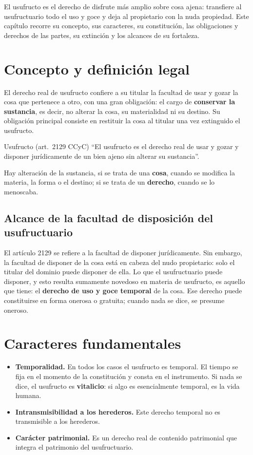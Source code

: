\documentclass[12pt,oneside]{book}
\begin{document}
El usufructo es el derecho de disfrute más amplio sobre cosa ajena: transfiere al usufructuario todo el uso y goce y deja al propietario con la nuda propiedad. Este capítulo recorre su concepto, sus caracteres, su constitución, las obligaciones y derechos de las partes, su extinción y los alcances de su fortaleza.

\section{Concepto y definición legal}

El derecho real de usufructo confiere a su titular la facultad de usar y gozar la cosa que pertenece a otro, con una gran obligación: el cargo de \textbf{conservar la sustancia}, es decir, no alterar la cosa, su materialidad ni su destino. Su obligación principal consiste en restituir la cosa al titular una vez extinguido el usufructo.

\begin{definition}{Usufructo (art.~2129 CCyC)}
``El usufructo es el derecho real de usar y gozar y disponer jurídicamente de un bien ajeno sin alterar su sustancia''.
\end{definition}

Hay alteración de la sustancia, si se trata de una \textbf{cosa}, cuando se modifica la materia, la forma o el destino; si se trata de un \textbf{derecho}, cuando se lo menoscaba.

\subsection{Alcance de la facultad de disposición del usufructuario}

El artículo 2129 se refiere a la facultad de disponer jurídicamente. Sin embargo, la facultad de disponer de la cosa está en cabeza del nudo propietario: solo el titular del dominio puede disponer de ella. Lo que el usufructuario puede disponer, y esto resulta sumamente novedoso en materia de usufructo, es aquello que tiene: el \textbf{derecho de uso y goce temporal} de la cosa. Ese derecho puede constituirse en forma onerosa o gratuita; cuando nada se dice, se presume oneroso.

\section{Caracteres fundamentales}

\begin{itemize}
    \item \textbf{Temporalidad.} En todos los casos el usufructo es temporal. El tiempo se fija en el momento de la constitución y consta en el instrumento. Si nada se dice, el usufructo es \textbf{vitalicio}: si algo es esencialmente temporal, es la vida humana.
    \item \textbf{Intransmisibilidad a los herederos.} Este derecho temporal no es transmisible a los herederos.
    \item \textbf{Carácter patrimonial.} Es un derecho real de contenido patrimonial que integra el patrimonio del usufructuario.
\end{itemize}
\end{document}
